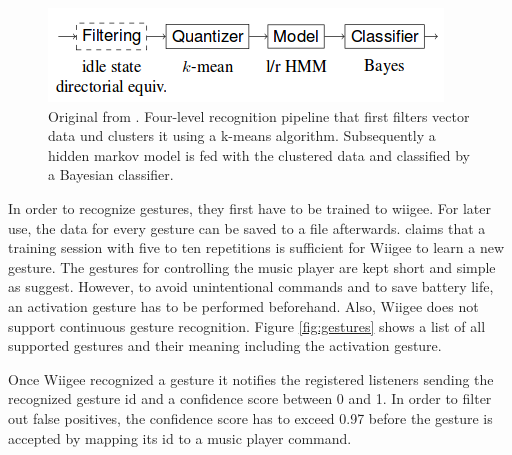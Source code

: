 \begin{figure}[bth]
	\myfloatalign
	\includegraphics[width=.99\linewidth]{img/wiigeePipeline.png}
	\caption{Original from \cite{Schlomer:2008:GRW:1347390.1347395}. Four-level recognition pipeline that first filters vector data und clusters it using a k-means algorithm. Subsequently a hidden markov model is fed with the clustered data and classified by a Bayesian classifier.}
	\label{fig:wiigeePipeline}
\end{figure}

In order to recognize gestures, they first have to be trained to wiigee. For later use, the data for every gesture can be saved to a file afterwards. \cite{Schlomer:2008:GRW:1347390.1347395} claims that a training session with five to ten repetitions is sufficient for Wiigee to learn a new gesture. The gestures for controlling the music player are kept short and simple as \cite{kuhnel2011m} suggest. However, to avoid unintentional commands and to save battery life, an activation gesture has to be performed beforehand. Also, Wiigee does not support continuous gesture recognition. Figure \ref{fig:gestures} shows a list of all supported gestures and their meaning including the activation gesture. 

Once Wiigee recognized a gesture it notifies the registered listeners sending the recognized gesture id and a confidence score between 0 and 1. In order to filter out false positives, the confidence score has to exceed 0.97 before the gesture is accepted by mapping its id to a music player command.

